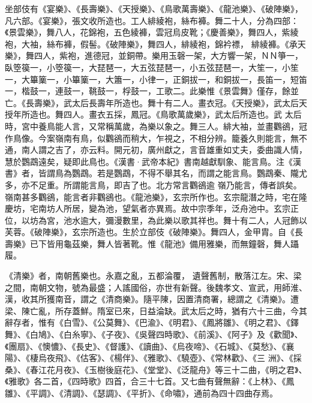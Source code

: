 \begin{pinyinscope}
 坐部伎有《宴樂》、《長壽樂》、《天授樂》、《鳥歌萬壽樂》、《龍池樂》、《破陣樂》，凡六部。《宴樂》，張文收所造也。工人緋綾袍，絲布褲。舞二十人，分為四部：《景雲樂》，舞八人，花錦袍，五色綾褲，雲冠烏皮靴；《慶善樂》，舞四人，紫綾袍，大袖，絲布褲，假髻。《破陣樂》，舞四人，緋綾袍，錦衿褾，
 緋綾褲。《承天樂》，舞四人，紫袍，進德冠，並銅帶。樂用玉磬一架，大方響一架，ＮＮ箏一，臥箜篌一，小箜篌一，大琵琶一，大五弦琵琶一，小五弦琵琶一，大笙一，小笙一，大篳篥一，小篳篥一，大簫一，小律一，正銅拔一，和銅拔一，長笛一，短笛一，楷鼓一，連鼓一，鞉鼓一，桴鼓一，工歌二。此樂惟《景雲舞》僅存，餘並亡。《長壽樂》，武太后長壽年所造也。舞十有二人。畫衣冠。《天授樂》，武太后天授年所造也。舞四人。畫衣五採，鳳冠。《鳥歌萬歲樂》，武太后所造也。武
 太后時，宮中養鳥能人言，又常稱萬歲，為樂以象之。舞三人。緋大袖，並畫鸜鵒，冠作鳥像。今案嶺南有鳥，似鸜鵒而稍大，乍視之，不相分辨。籠養久則能言，無不通，南人謂之吉了，亦云料。開元初，廣州獻之，言音雄重如丈夫，委曲識人情，慧於鸚鵡遠矣，疑即此鳥也。《漢書·武帝本紀》書南越獻馴象、能言鳥。注《漢書》者，皆謂鳥為鸚鵡。若是鸚鵡，不得不舉其名，而謂之能言鳥。鸚鵡秦、隴尤多，亦不足重。所謂能言鳥，即吉了也。北方常言鸜鵒逾
 嶺乃能言，傳者誤矣。嶺南甚多鸜鵒，能言者非鸜鵒也。《龍池樂》，玄宗所作也。玄宗龍潛之時，宅在隆慶坊，宅南坊人所居，變為池，望氣者亦異焉。故中宗季年，泛舟池中。玄宗正位，以坊為宮，池水逾大，彌漫數里，為此樂以歌其祥也。舞十有二人，人冠飾以芙蓉。《破陣樂》，玄宗所造也。生於立部伎《破陣樂》。舞四人，金甲胄。自《長壽樂》已下皆用龜茲樂，舞人皆著靴。惟《龍池》備用雅樂，而無鐘磬，舞人躡履。



 《清樂》者，南朝舊樂也。永嘉之亂，五都淪覆，
 遺聲舊制，散落江左。宋、梁之間，南朝文物，號為最盛；人謠國俗，亦世有新聲。後魏孝文、宣武，用師淮、漢，收其所獲南音，謂之《清商樂》。隨平陳，因置清商署，總謂之《清樂》。遭梁、陳亡亂，所存蓋鮮。隋室已來，日益淪缺。武太后之時，猶有六十三曲，今其辭存者，惟有《白雪》、《公莫舞》、《巴渝》、《明君》、《鳳將雛》、《明之君》、《鐸舞》、《白鳩》、《白糸寧》、《子夜》、《吳聲四時歌》、《前溪》、《阿子》及《歡聞》、《團扇》、《懊憹》、《長史》、《督護》、《讀曲》、《烏夜啼》、《石城》、《莫愁》、《襄陽》、《棲烏夜飛》、《估客》、《楊伴》、《雅歌》、《驍壺》、《常林歡》、《三
 洲》、《採桑》、《春江花月夜》、《玉樹後庭花》、《堂堂》、《泛龍舟》等三十二曲，《明之君》、《雅歌》各二首，《四時歌》四首，合三十七首。又七曲有聲無辭：《上林》、《鳳雛》、《平調》、《清調》、《瑟調》、《平折》、《命嘯》，通前為四十四曲存焉。




\end{pinyinscope}
